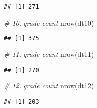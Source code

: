 \documentclass[
]{article}
\newenvironment{Shaded}{\begin{snugshade}}{\end{snugshade}}
\newcommand{\CommentTok}[1]{\textcolor[rgb]{0.56,0.35,0.01}{\textit{#1}}}
\newcommand{\FunctionTok}[1]{\textcolor[rgb]{0.00,0.00,0.00}{#1}}
\newcommand{\NormalTok}[1]{#1}
\newcommand{\OtherTok}[1]{\textcolor[rgb]{0.56,0.35,0.01}{#1}}
\newcommand{\SpecialCharTok}[1]{\textcolor[rgb]{0.00,0.00,0.00}{#1}}
\newcommand{\StringTok}[1]{\textcolor[rgb]{0.31,0.60,0.02}{#1}}
\begin{document}
\begin{Shaded}
\end{Shaded}

\begin{verbatim}
## [1] 271
\end{verbatim}

\begin{Shaded}
\begin{Highlighting}[]
\CommentTok{\# 10. grade count}
\FunctionTok{nrow}\NormalTok{(dt10)}
\end{Highlighting}
\end{Shaded}

\begin{verbatim}
## [1] 375
\end{verbatim}

\begin{Shaded}
\begin{Highlighting}[]
\CommentTok{\# 11. grade count}
\FunctionTok{nrow}\NormalTok{(dt11)}
\end{Highlighting}
\end{Shaded}

\begin{verbatim}
## [1] 270
\end{verbatim}

\begin{Shaded}
\begin{Highlighting}[]
\CommentTok{\# 12. grade count}
\FunctionTok{nrow}\NormalTok{(dt12)}
\end{Highlighting}
\end{Shaded}

\begin{verbatim}
## [1] 203
\end{verbatim}
\end{document}
